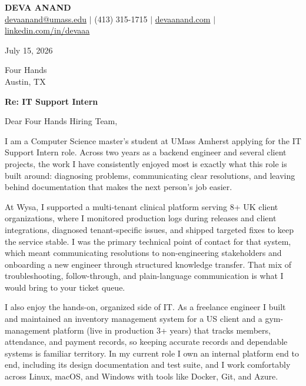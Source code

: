 \documentclass[letterpaper,11pt]{article}
\begin{document}
\begin{center}
    {\fontsize{18}{20}\selectfont\bfseries DEVA ANAND}\\ \vspace{3pt}
    {\small
    \href{mailto:devaanand@umass.edu}{devaanand@umass.edu}
    \enspace$\vert$\enspace
    (413) 315-1715
    \enspace$\vert$\enspace
    \href{https://devaanand.com}{devaanand.com}
    \enspace$\vert$\enspace
    \href{https://linkedin.com/in/devaaa/}{linkedin.com/in/devaaa}}
\end{center}
\vspace{6pt}

\noindent July 15, 2026

\vspace{2pt}

\noindent Four Hands\\
Austin, TX

\vspace{2pt}

\noindent \textbf{Re: IT Support Intern}

\vspace{4pt}

\noindent Dear Four Hands Hiring Team,

I am a Computer Science master's student at UMass Amherst applying for the IT Support Intern role. Across two years as a backend engineer and several client projects, the work I have consistently enjoyed most is exactly what this role is built around: diagnosing problems, communicating clear resolutions, and leaving behind documentation that makes the next person's job easier.

At Wysa, I supported a multi-tenant clinical platform serving 8+ UK client organizations, where I monitored production logs during releases and client integrations, diagnosed tenant-specific issues, and shipped targeted fixes to keep the service stable. I was the primary technical point of contact for that system, which meant communicating resolutions to non-engineering stakeholders and onboarding a new engineer through structured knowledge transfer. That mix of troubleshooting, follow-through, and plain-language communication is what I would bring to your ticket queue.

I also enjoy the hands-on, organized side of IT. As a freelance engineer I built and maintained an inventory management system for a US client and a gym-management platform (live in production 3+ years) that tracks members, attendance, and payment records, so keeping accurate records and dependable systems is familiar territory. In my current role I own an internal platform end to end, including its design documentation and test suite, and I work comfortably across Linux, macOS, and Windows with tools like Docker, Git, and Azure.
\end{document}
